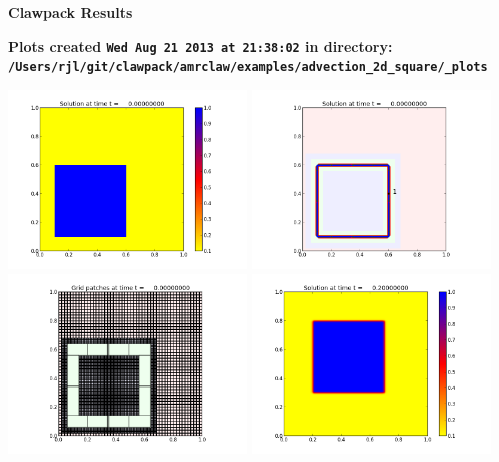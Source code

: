 \documentclass[11pt]{article}
\begin{document}
        \begin{center}{\Large\bf Clawpack Results}\vskip 5pt
        
        \bf Plots created {\tt Wed Aug 21 2013 at 21:38:02} in directory: \vskip 5pt
        \verb+/Users/rjl/git/clawpack/amrclaw/examples/advection_2d_square/_plots+
        \end{center}
        \vskip 5pt
        \includegraphics[width=0.475\textwidth]{frame0000fig0.png}
\includegraphics[width=0.475\textwidth]{frame0000fig1.png}
\vskip 10pt 
\includegraphics[width=0.475\textwidth]{frame0000fig2.png}
\vskip 10pt 
\includegraphics[width=0.475\textwidth]{frame0001fig0.png}
\end{document}
